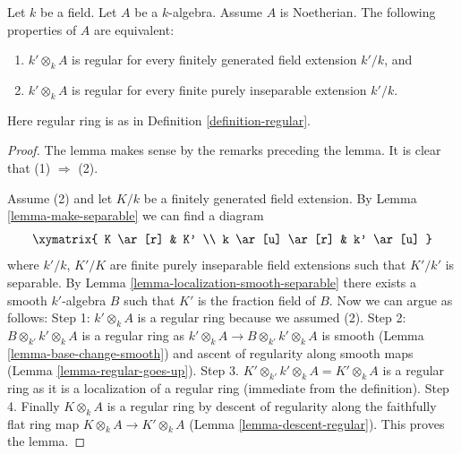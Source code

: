 \begin{lemma}
\label{lemma-geometrically-regular}
Let $k$ be a field. Let $A$ be a $k$-algebra.
Assume $A$ is Noetherian.
The following properties of $A$ are equivalent:
\begin{enumerate}
\item $k' \otimes_k A$ is regular for every finitely generated field
extension $k'/k$, and
\item $k' \otimes_k A$ is regular for every finite purely inseparable
extension $k'/k$.
\end{enumerate}
Here regular ring is as in Definition \ref{definition-regular}.
\end{lemma}

\begin{proof}
The lemma makes sense by the remarks preceding the lemma.
It is clear that (1) $\Rightarrow$ (2).

\medskip\noindent
Assume (2) and let $K/k$ be a finitely generated field extension.
By Lemma \ref{lemma-make-separable} we can find a diagram
$$
\xymatrix{
K \ar[r] & K' \\
k \ar[u] \ar[r] & k' \ar[u]
}
$$
where $k'/k$, $K'/K$ are finite purely inseparable field
extensions such that $K'/k'$ is separable. By
Lemma \ref{lemma-localization-smooth-separable}
there exists a smooth $k'$-algebra $B$ such that $K'$ is the
fraction field of $B$. Now we can argue as follows:
Step 1: $k' \otimes_k A$ is a regular ring because we assumed (2).
Step 2: $B \otimes_{k'} k' \otimes_k A$ is a regular ring as
$k' \otimes_k A \to B \otimes_{k'} k' \otimes_k A$ is smooth
(Lemma \ref{lemma-base-change-smooth})
and ascent of regularity along smooth maps
(Lemma \ref{lemma-regular-goes-up}).
Step 3. $K' \otimes_{k'} k' \otimes_k A = K' \otimes_k A$ is
a regular ring as it is a localization of a regular ring
(immediate from the definition).
Step 4. Finally $K \otimes_k A$ is a regular ring by descent of
regularity along the faithfully flat ring map
$K \otimes_k A \to K' \otimes_k A$ (Lemma \ref{lemma-descent-regular}).
This proves the lemma.
\end{proof}

